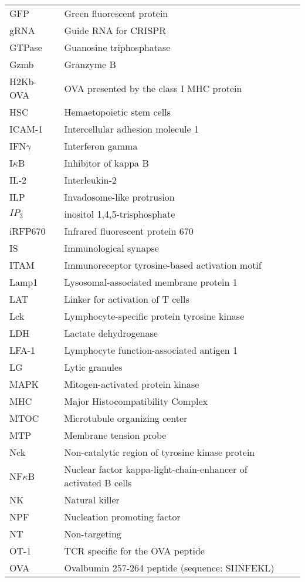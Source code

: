 \documentclass[phd,tocprelim]{cornell}
\begin{document}
\begin{table}
\begin{tabular}{l m{10cm} l}
	GFP & Green fluorescent protein \\
	gRNA & Guide RNA for CRISPR \\
	GTPase & Guanosine triphosphatase \\
	Gzmb & Granzyme B \\
	H2Kb-OVA & OVA presented by the class I MHC protein \\
	HSC & Hemaetopoietic stem cells \\
	ICAM-1 & Intercellular adhesion molecule 1 \\
	IFN$\gamma$ & Interferon gamma \\
	I$\kappa$B & Inhibitor of kappa B \\
	IL-2 & Interleukin-2 \\
	ILP & Invadosome-like protrusion\\
	$IP_3$ & inositol 1,4,5-trisphosphate \\
	iRFP670 & Infrared fluorescent protein 670 \\
	IS & Immunological synapse \\
	ITAM & Immunoreceptor tyrosine-based activation motif \\
	Lamp1 & Lysosomal-associated membrane protein 1 \\
	LAT & Linker for activation of T cells \\
	Lck & Lymphocyte-specific protein tyrosine kinase \\
	LDH	& Lactate dehydrogenase \\
	LFA-1 & Lymphocyte function-associated antigen 1 \\
	LG & Lytic granules \\
	MAPK & Mitogen-activated protein kinase \\
	MHC & Major Histocompatibility Complex \\
	MTOC & Microtubule organizing center \\
	MTP & Membrane tension probe \\
	Nck & Non-catalytic region of tyrosine kinase protein \\
	NF$\kappa$B & Nuclear factor kappa-light-chain-enhancer of activated B cells \\
	NK & Natural killer \\
	NPF & Nucleation promoting factor \\
	NT & Non-targeting \\
	OT-1 & TCR specific for the OVA peptide \\
	OVA & Ovalbumin 257-264 peptide (sequence: SIINFEKL) \\

\end{tabular}
\end{table}
\end{document}
